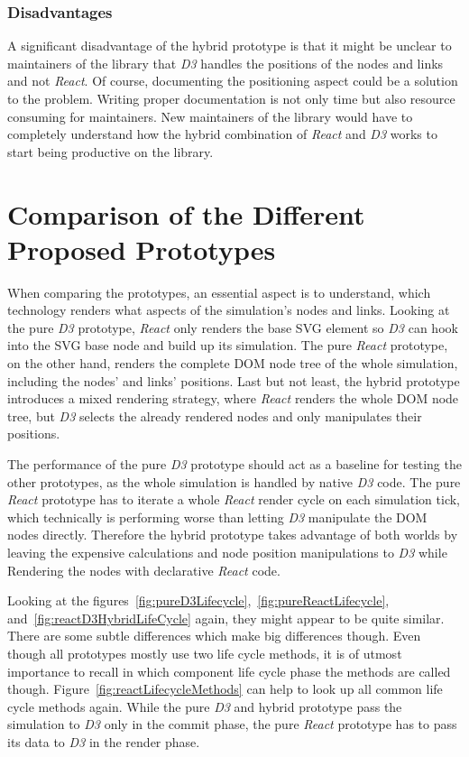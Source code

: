 \subsubsection{Disadvantages}
\label{subsub:hybridDisadvantages}

A sig\-nifi\-cant disadvantage of the hybrid prototype is that it might be unclear to maintainers of the library that \emph{D3} handles the positions of the nodes and links and not \emph{React}. Of course, documenting the positioning aspect could be a solution to the problem. Writing proper documentation is not only time but also resource consuming for maintainers. New maintainers of the library would have to completely understand how the hybrid combination of \emph{React} and \emph{D3} works to start being productive on the library.

\section{Comparison of the Different Proposed Prototypes}

When comparing the prototypes, an essential aspect is to understand, which technology renders what aspects of the simulation's nodes and links. Looking at the pure \emph{D3} prototype, \emph{React} only renders the base SVG element so \emph{D3} can hook into the SVG base node and build up its simulation. The pure \emph{React} prototype, on the other hand, renders the complete DOM node tree of the whole simulation, including the nodes' and links' positions. Last but not least, the hybrid prototype introduces a mixed rendering strategy, where \emph{React} renders the whole DOM node tree, but \emph{D3} selects the already rendered nodes and only manipulates their positions.

The performance of the pure \emph{D3} prototype should act as a baseline for testing the other prototypes, as the whole simulation is handled by native \emph{D3} code. The pure \emph{React} prototype has to iterate a whole \emph{React} render cycle on each simulation tick, which technically is performing worse than letting \emph{D3} manipulate the DOM nodes directly. Therefore the hybrid prototype takes advantage of both worlds by leaving the expensive calculations and node position manipulations to \emph{D3} while Rendering the nodes with declarative \emph{React} code.

Looking at the figures~\ref{fig:pureD3Lifecycle},~\ref{fig:pureReactLifecycle}, and~\ref{fig:reactD3HybridLifeCycle} again, they might appear to be quite similar. There are some subtle differences which make big differences though. Even though all prototypes mostly use two life cycle methods, it is of utmost importance to recall in which component life cycle phase the methods are called though. Figure~\ref{fig:reactLifecycleMethods} can help to look up all common life cycle methods again. While the pure \emph{D3} and hybrid prototype pass the simulation to \emph{D3} only in the commit phase, the pure \emph{React} prototype has to pass its data to \emph{D3} in the render phase.

